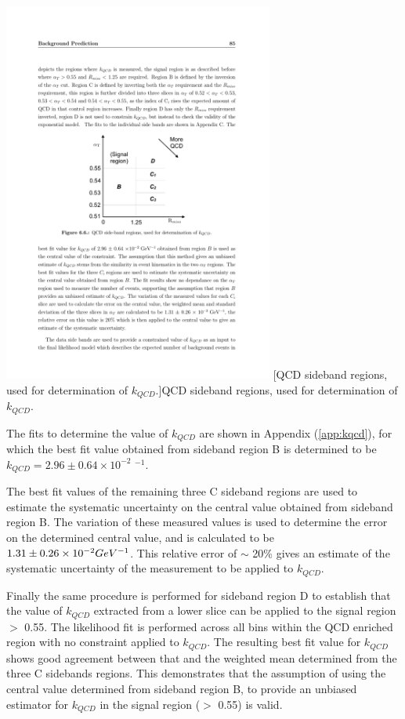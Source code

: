\begin{minipage}{\linewidth}
\centering
\includegraphics[width = 3.5in]{plots/qcd_cartoon.pdf}
[QCD sideband regions, used for determination of $k_{QCD}$.]{QCD sideband regions, used for determination of $k_{QCD}$.}
\label{fig:qcdcartoon}
\end{minipage}

The fits to determine the value of $k_{QCD}$ are shown in Appendix (\ref{app:kqcd}), for which the best fit value obtained from sideband region B is determined to be $k_{QCD} = 2.96 \pm 0.64 \times 10^{-2}$ \GeV$^{-1}$. 

The best fit values of the remaining three C sideband regions are used to estimate the systematic uncertainty on the central value obtained from sideband region B. The variation of these measured values is used to determine the error on the determined central value, and is calculated to be $1.31 \pm 0.26 \times 10^{-2} GeV^{-1}$. This relative error of $\sim$ 20\% gives an estimate of the systematic uncertainty of the measurement to be applied to $k_{QCD}$.

Finally the same procedure is performed for sideband region D to establish that the value of $k_{QCD}$ extracted from a lower \alphat slice can be applied to the signal region \alphat $>$ 0.55. The likelihood fit is performed across all \theht bins within the QCD enriched region with no constraint applied to $k_{QCD}$. The resulting best fit value for $k_{QCD}$ shows good agreement between that and the weighted mean determined from the three C sidebands regions. This demonstrates that the assumption of using the central value determined from sideband region B, to provide an unbiased estimator for $k_{QCD}$ in the signal region (\alphat $>$ 0.55) is valid.

